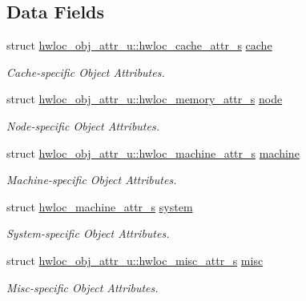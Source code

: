 \subsection*{Data Fields}
\begin{CompactItemize}
\item 
struct \hyperlink{structhwloc__obj__attr__u_1_1hwloc__cache__attr__s}{hwloc\_\-obj\_\-attr\_\-u::hwloc\_\-cache\_\-attr\_\-s} \hyperlink{unionhwloc__obj__attr__u_b5a8ae3bf490e6b1071fea53f7382836}{cache}
\begin{CompactList}\small\item\em Cache-specific Object Attributes. \item\end{CompactList}\item 
struct \hyperlink{structhwloc__obj__attr__u_1_1hwloc__memory__attr__s}{hwloc\_\-obj\_\-attr\_\-u::hwloc\_\-memory\_\-attr\_\-s} \hyperlink{unionhwloc__obj__attr__u_941994ad83275213249f8adfd8204465}{node}
\begin{CompactList}\small\item\em Node-specific Object Attributes. \item\end{CompactList}\item 
struct \hyperlink{structhwloc__obj__attr__u_1_1hwloc__machine__attr__s}{hwloc\_\-obj\_\-attr\_\-u::hwloc\_\-machine\_\-attr\_\-s} \hyperlink{unionhwloc__obj__attr__u_5b42966df7c5bfdc36891e414cc31607}{machine}
\begin{CompactList}\small\item\em Machine-specific Object Attributes. \item\end{CompactList}\item 
struct \hyperlink{structhwloc__obj__attr__u_1_1hwloc__machine__attr__s}{hwloc\_\-machine\_\-attr\_\-s} \hyperlink{unionhwloc__obj__attr__u_a65b98d3eada000628dc66668e4954df}{system}
\begin{CompactList}\small\item\em System-specific Object Attributes. \item\end{CompactList}\item 
struct \hyperlink{structhwloc__obj__attr__u_1_1hwloc__misc__attr__s}{hwloc\_\-obj\_\-attr\_\-u::hwloc\_\-misc\_\-attr\_\-s} \hyperlink{unionhwloc__obj__attr__u_33b7e687b61be1b62e22f4037788582c}{misc}
\begin{CompactList}\small\item\em Misc-specific Object Attributes. \item\end{CompactList}\end{CompactItemize}



